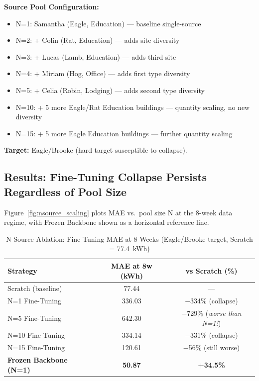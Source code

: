 \documentclass[12pt,a4paper]{report}
\begin{document}
\textbf{Source Pool Configuration:}

\begin{itemize}
    \item N=1: Samantha (Eagle, Education) — baseline single-source
    \item N=2: + Colin (Rat, Education) — adds site diversity
    \item N=3: + Lucas (Lamb, Education) — adds third site
    \item N=4: + Miriam (Hog, Office) — adds first type diversity
    \item N=5: + Celia (Robin, Lodging) — adds second type diversity
    \item N=10: + 5 more Eagle/Rat Education buildings — quantity scaling, no new diversity
    \item N=15: + 5 more Eagle Education buildings — further quantity scaling
\end{itemize}

\textbf{Target:} Eagle/Brooke (hard target susceptible to collapse).

\subsection{Results: Fine-Tuning Collapse Persists Regardless of Pool Size}

Figure~\ref{fig:nsource_scaling} plots MAE vs.\ pool size N at the 8-week data regime, with Frozen Backbone shown as a horizontal reference line.

\begin{table}[H]
\centering
\caption{N-Source Ablation: Fine-Tuning MAE at 8 Weeks (Eagle/Brooke target, Scratch = 77.4~kWh)}
\small
\begin{tabular}{lcc}
\toprule
\textbf{Strategy} & \textbf{MAE at 8w (kWh)} & \textbf{vs Scratch (\%)} \\
\midrule
Scratch (baseline) & 77.44 & --- \\
N=1 Fine-Tuning & 336.03 & $-$334\% (collapse) \\
N=5 Fine-Tuning & 642.30 & $-$729\% (\textit{worse than N=1!}) \\
N=10 Fine-Tuning & 334.14 & $-$331\% (collapse) \\
N=15 Fine-Tuning & 120.61 & $-$56\% (still worse) \\
\midrule
\textbf{Frozen Backbone (N=1)} & \textbf{50.87} & \textbf{+34.5\%} \\
\bottomrule
\end{tabular}
\end{table}
\end{document}
